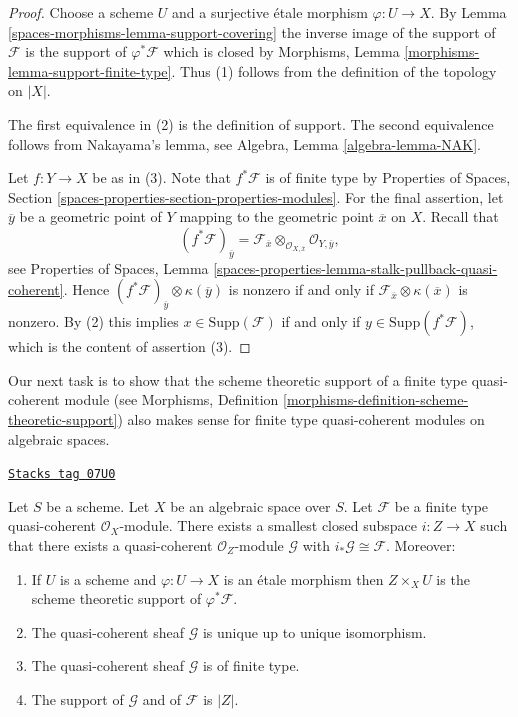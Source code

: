 \begin{proof}
Choose a scheme $U$ and a surjective \'etale morphism $\varphi : U \to X$.
By Lemma \ref{spaces-morphisms-lemma-support-covering} the inverse image of the support of
$\mathcal{F}$ is the support of $\varphi^*\mathcal{F}$ which is closed by
Morphisms, Lemma \ref{morphisms-lemma-support-finite-type}.
Thus (1) follows from the definition of the topology on $|X|$.

\medskip\noindent
The first equivalence in (2) is the definition of support.
The second equivalence follows from Nakayama's lemma, see
Algebra, Lemma \ref{algebra-lemma-NAK}.

\medskip\noindent
Let $f : Y \to X$ be as in (3). Note that $f^*\mathcal{F}$ is of finite type
by Properties of Spaces, Section
\ref{spaces-properties-section-properties-modules}.
For the final assertion, let $\overline{y}$ be a geometric point of $Y$
mapping to the geometric point $\overline{x}$ on $X$. Recall that
$$
(f^*\mathcal{F})_{\overline{y}} =
\mathcal{F}_{\overline{x}} \otimes_{\mathcal{O}_{X, \overline{x}}}
\mathcal{O}_{Y, \overline{y}},
$$
see Properties of Spaces, Lemma
\ref{spaces-properties-lemma-stalk-pullback-quasi-coherent}.
Hence $(f^*\mathcal{F})_{\overline{y}} \otimes \kappa(\overline{y})$
is nonzero if and only if
$\mathcal{F}_{\overline{x}} \otimes \kappa(\overline{x})$ is nonzero.
By (2) this implies $x \in \text{Supp}(\mathcal{F})$ if and only
if $y \in \text{Supp}(f^*\mathcal{F})$, which is the content of
assertion (3).
\end{proof}

Our next task is to show that the scheme theoretic support
of a finite type quasi-coherent module (see
Morphisms, Definition \ref{morphisms-definition-scheme-theoretic-support})
also makes sense for finite type quasi-coherent modules on
algebraic spaces.

\begin{lemma}
\label{spaces-morphisms-lemma-scheme-theoretic-support}
\href{https://stacks.math.columbia.edu/tag/07U0}{\texttt{Stacks tag 07U0}}

Let $S$ be a scheme. Let $X$ be an algebraic space over $S$.
Let $\mathcal{F}$ be a finite type quasi-coherent $\mathcal{O}_X$-module.
There exists a smallest closed subspace $i : Z \to X$ such that there
exists a quasi-coherent $\mathcal{O}_Z$-module $\mathcal{G}$ with
$i_*\mathcal{G} \cong \mathcal{F}$. Moreover:
\begin{enumerate}
\item If $U$ is a scheme and $\varphi : U \to X$ is an \'etale morphism
then $Z \times_X U$ is the scheme theoretic support of $\varphi^*\mathcal{F}$.
\item The quasi-coherent sheaf $\mathcal{G}$ is unique up to unique
isomorphism.
\item The quasi-coherent sheaf $\mathcal{G}$ is of finite type.
\item The support of $\mathcal{G}$ and of $\mathcal{F}$ is $|Z|$.
\end{enumerate}
\end{lemma}

